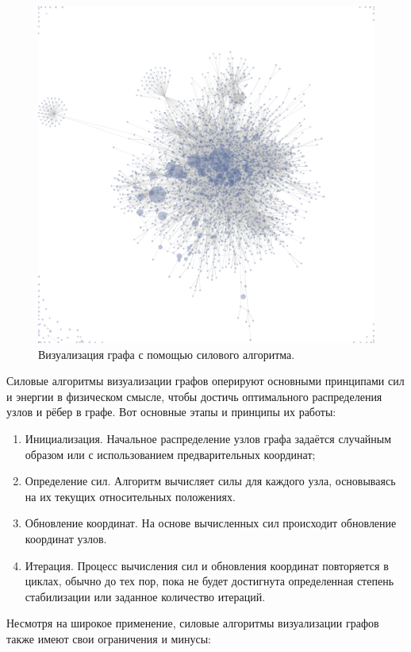 \documentclass[14pt, russian]{scrartcl}
\begin{document}
\begin{figure}[H]
\centering
  \begin{minipage}[t]{.8\textwidth}
  \centering
\includegraphics[width=.7\textwidth]{./imgs/force-directed-example.png}
  \end{minipage}
\caption{Визуализация графа с помощью силового алгоритма.}
\label{fig:force_directed_example}
\end{figure}

Силовые алгоритмы визуализации графов оперируют основными принципами сил и энергии в физическом смысле, чтобы достичь оптимального распределения узлов и рёбер в графе. Вот основные этапы и принципы их работы:

\begin{enumerate}
	\item Инициализация. Начальное распределение узлов графа задаётся случайным образом или с использованием предварительных координат;
	\item Определение сил. Алгоритм вычисляет силы для каждого узла, основываясь на их текущих относительных положениях.
	\item Обновление координат. На основе вычисленных сил происходит обновление координат узлов.
	\item Итерация. Процесс вычисления сил и обновления координат повторяется в циклах, обычно до тех пор, пока не будет достигнута определенная степень стабилизации или заданное количество итераций.
\end{enumerate}

Несмотря на  широкое применение, силовые алгоритмы визуализации графов также имеют свои ограничения и минусы:
\end{document}
